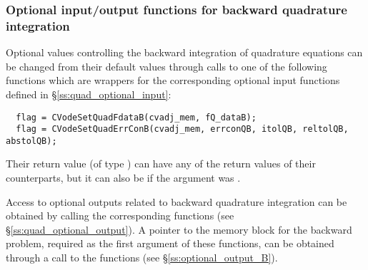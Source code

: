\subsubsection{Optional input/output functions for backward quadrature integration}
Optional values controlling the backward integration of quadrature equations can be changed
from their default values through calls to one of the following functions which are wrappers for
the corresponding optional input functions defined in \S\ref{ss:quad_optional_input}:
\begin{verbatim}
  flag = CVodeSetQuadFdataB(cvadj_mem, fQ_dataB);
  flag = CVodeSetQuadErrConB(cvadj_mem, errconQB, itolQB, reltolQB, abstolQB);
\end{verbatim}
Their return value  (of type ) can have any of the return values 
of their counterparts, but it can also be  if the  
argument was . 

Access to optional outputs related to backward quadrature integration can be obtained
by calling the corresponding  functions 
(see \S\ref{ss:quad_optional_output}). 
A pointer to the {\cvodes} memory block for the backward problem, required as the first 
argument of these functions, can be obtained through a call to the functions 
 (see \S\ref{ss:optional_output_B}).

